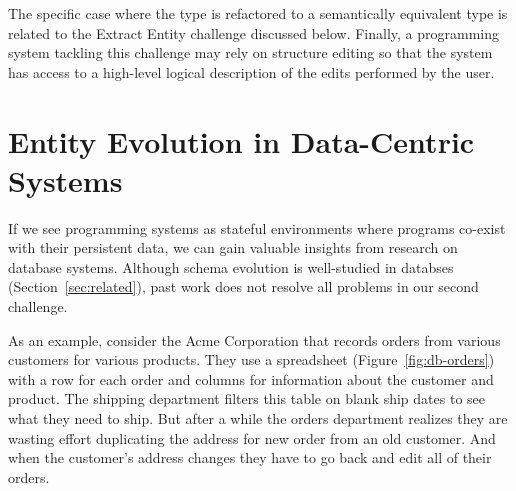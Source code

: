 \documentclass[english,submission]{programming}
\begin{document}
The specific case where the type is refactored to a semantically equivalent type is related to
the Extract Entity challenge discussed below. Finally, a programming system tackling this
challenge may rely on structure editing so that the system has access to a high-level logical
description of the edits performed by the user.


\section{Entity Evolution in Data-Centric Systems}
If we see programming systems as stateful environments where programs co-exist with their persistent
data, we can gain valuable insights from research on database systems.
Although schema evolution is well-studied in databses (Section~\ref{sec:related}), past work
does not resolve all problems in our second challenge.

As an example, consider the Acme Corporation that records orders from various customers for
various products. They use a spreadsheet (Figure~\ref{fig:db-orders}) with a row for each order
and columns for information about the customer and product. The shipping department filters this
table on blank ship dates to see what they need to ship. But after a while the orders department
realizes they are wasting effort duplicating the address for new order from an old customer. And
when the customer's address changes they have to go back and edit all of their orders.
\end{document}
